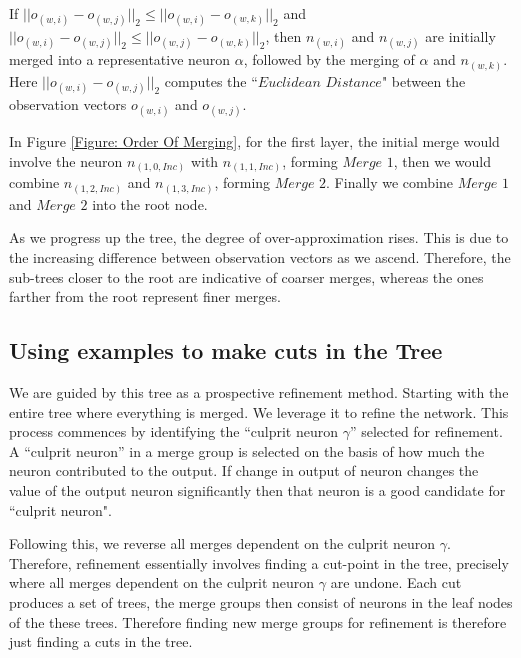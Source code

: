 If $||o_{(w, i)} - o_{(w, j)}||_{2} \leq ||o_{(w, i)} - 
o_{(w, k)}||_{2}$ and $||o_{(w, i)} - o_{(w, j)}||_2 \leq ||o_{(w, j)} - 
o_{(w, k)}||_{2}$, then $n_{(w, i)}$ and $n_{(w, j)}$ are initially merged into a 
representative neuron $\alpha$, followed by the merging of $\alpha$ and $n_{(w, k)}$. 
Here $||o_{(w, i)} - o_{(w, j)}||_{2}$ computes the ``$\textit{Euclidean 
Distance}$" between the observation vectors $o_{(w, i)}$ and  $o_{(w, j)}$.


In Figure \ref{Figure: Order Of Merging}, for the first layer, the initial 
merge would involve the neuron $n_{(1, 0, Inc)}$ with $n_{(1, 1, Inc)}$, 
forming $\textit{Merge 1}$, then we would combine $n_{(1, 2, Inc)}$ and 
$n_{(1, 3, Inc)}$, forming $\textit{Merge 2}$. Finally we combine 
$\textit{Merge 1}$ and $\textit{Merge 2}$ into the root node. 

As we progress up the tree, the degree of over-approximation rises. 
This is due to the increasing difference between observation vectors as 
we ascend. Therefore, the sub-trees closer to the root are indicative of 
coarser merges, whereas the ones farther from the root represent finer merges. 


\subsection{Using examples to make cuts in the Tree} 
We are guided by this tree as a prospective refinement method. Starting with the 
entire tree where everything is merged. We leverage it to refine the network.
This process commences by identifying the ``culprit neuron $\gamma$'' 
selected for refinement. A ``culprit neuron'' in a merge group is selected 
on the basis of how much the neuron contributed to the output. If change in 
output of  neuron changes the value of the output neuron significantly then
that neuron is a good candidate for ``culprit neuron". 

Following this, we reverse all merges dependent on the culprit 
neuron $\gamma$. Therefore, refinement essentially involves finding a 
cut-point in the tree, precisely where all merges dependent on the 
culprit neuron $\gamma$ are undone. Each cut produces a set of trees, 
the merge groups then consist of neurons in the leaf nodes of the  these trees.
Therefore finding new merge groups for refinement is therefore just finding a 
cuts in the tree.

